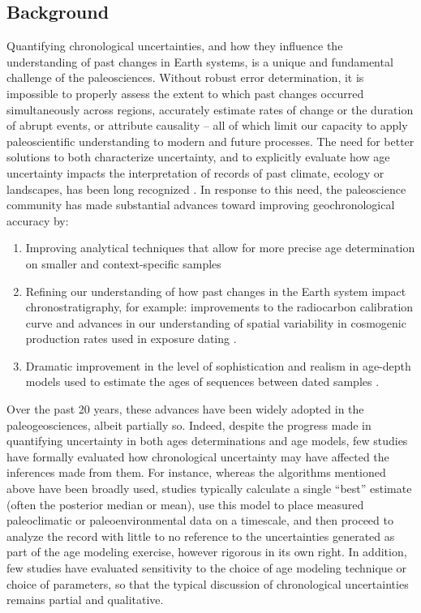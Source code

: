 \documentclass[gchron, manuscript]{copernicus}
\begin{document}
\introduction

\subsection{Background}

Quantifying chronological uncertainties, and how they influence the understanding of past changes in Earth systems, is a unique and fundamental challenge of the paleosciences.
Without robust error determination, it is impossible to properly assess the extent to which past changes occurred simultaneously across regions, accurately estimate rates of change or the duration of abrupt events, or attribute causality -- all of which limit our capacity to apply paleoscientific understanding to modern and future processes.
The need for better solutions to both characterize uncertainty, and to explicitly evaluate how age uncertainty impacts the interpretation of records of past climate, ecology or landscapes, has been long recognized \citep[e.g.,][]{Noren2013, NASEM_CORES_2020}.
In response to this need, the paleoscience community has made substantial advances toward improving geochronological accuracy by:

\begin{enumerate}
\def\labelenumi{\arabic{enumi}.}
\item
  Improving analytical techniques that allow for more precise age determination on smaller and context-specific samples \citep[e.g.,][]{Eggins2005, Santos_blank_2010, zander2020miniature}
\item
  Refining our understanding of how past changes in the Earth system impact chronostratigraphy, for example: improvements to the radiocarbon calibration curve \citep{Reimer09, intcal13, intcal20} and advances in our understanding of spatial variability in cosmogenic production rates used in exposure dating \citep{Balco2009, Masarik2009, charreau2019basinga}.
\item
  Dramatic improvement in the level of sophistication and realism in age-depth models used to estimate the ages of sequences between dated samples \citep[e.g.][]{parnell2008flexible, Ramsey2009Bayesian, Blaauw2010CLAM, Blaauw2011BACON}.
\end{enumerate}

Over the past 20 years, these advances have been widely adopted in the paleogeosciences, albeit partially so. Indeed, despite the progress made in quantifying uncertainty in both ages determinations and age models, few studies have formally evaluated how chronological uncertainty may have affected the inferences made from them.
For instance, whereas the algorithms mentioned above have been broadly used, studies typically calculate a single ``best'' estimate (often the posterior median or mean), use this model to place measured paleoclimatic or paleoenvironmental data on a timescale, and then proceed to analyze the record with little to no reference to the uncertainties generated as part of the age modeling exercise, however rigorous in its own right.
In addition, few studies have evaluated sensitivity to the choice of age modeling technique or choice of parameters, so that the typical discussion of chronological uncertainties remains partial and qualitative.
\end{document}

